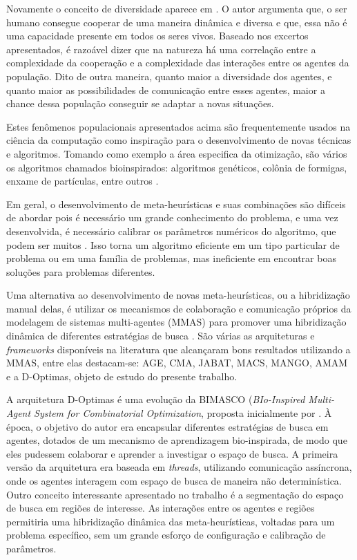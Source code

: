 Novamente o conceito de diversidade aparece em . O autor argumenta que, o ser humano consegue cooperar de uma maneira dinâmica e diversa e que, essa não é uma capacidade presente em todos os seres vivos. Baseado nos excertos apresentados, é razoável dizer que na natureza há uma correlação entre a complexidade da cooperação e a complexidade das interações entre os agentes da população. Dito de outra maneira, quanto maior a diversidade dos agentes, e quanto maior as possibilidades de comunicação entre esses agentes, maior a chance dessa população conseguir se adaptar a novas situações. 

Estes fenômenos populacionais apresentados acima são frequentemente usados na ciência da computação como inspiração para o desenvolvimento de novas técnicas e algoritmos. Tomando como exemplo a área especifica da otimização, são vários os algoritmos chamados bioinspirados: algoritmos genéticos, colônia de formigas, enxame de partículas, entre outros \cite{binitha2012}. 


Em geral, o desenvolvimento de meta-heurísticas e suas combinações são difíceis de abordar pois é necessário um grande conhecimento do problema, e uma vez desenvolvida, é necessário calibrar os parâmetros numéricos do algoritmo, que podem ser muitos \cite{stutzle2018}. Isso torna um algoritmo eficiente em um tipo particular de problema ou em uma família de problemas, mas ineficiente em encontrar boas soluções para problemas diferentes.

Uma alternativa ao desenvolvimento de novas meta-heurísticas, ou a hibridização manual delas, é utilizar os mecanismos de colaboração e comunicação próprios da modelagem de sistemas multi-agentes (MMAS) para promover uma hibridização dinâmica de diferentes estratégias de busca \cite{gong2015, zheng2015, fernandes2009, milano2004}. São várias as arquiteturas e \textit{frameworks} disponíveis na literatura que alcançaram bons resultados utilizando a MMAS, entre elas destacam-se: AGE, CMA, JABAT, MACS, MANGO, AMAM \cite{silva2018} e a D-Optimas, objeto de estudo do presente trabalho.

A arquitetura D-Optimas é uma evolução da BIMASCO (\textit{BIo-Inspired Multi-Agent System for Combinatorial Optimization}, proposta inicialmente por . À época, o objetivo do autor era encapsular diferentes estratégias de busca em agentes, dotados de um mecanismo de aprendizagem bio-inspirada, de modo que eles pudessem colaborar e aprender a investigar o espaço de busca. A primeira versão da arquitetura era baseada em \textit{threads}, utilizando comunicação assíncrona, onde os agentes interagem com espaço de busca de maneira não determinística. Outro conceito interessante apresentado no trabalho é a segmentação do espaço de busca em regiões de interesse. 
As interações entre os agentes e regiões permitiria uma hibridização dinâmica das meta-heurísticas, voltadas para um problema específico, sem um grande esforço de configuração e calibração de parâmetros.

